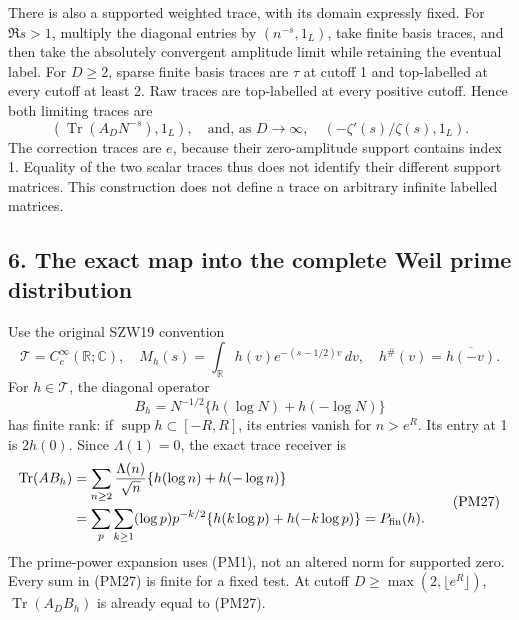 \documentclass[
  10pt,
  a4paper,
]{article}
\begin{document}
There is also a supported weighted trace, with its domain expressly
fixed. For \(\Re s>1\), multiply the diagonal entries by
\((n^{-s},1_L)\), take finite basis traces, and then take the absolutely
convergent amplitude limit while retaining the eventual label. For
\(D\ge2\), sparse finite basis traces are \(\tau\) at cutoff 1 and
top-labelled at every cutoff at least 2. Raw traces are top-labelled at
every positive cutoff. Hence both limiting traces are \[
\left(\operatorname{Tr}(A_DN^{-s}),1_L\right),
\quad\text{and, as }D\to\infty,\quad
\left(-\zeta'(s)/\zeta(s),1_L\right).
\tag{PM24}
\] The correction traces are \(e\), because their zero-amplitude support
contains index 1. Equality of the two scalar traces thus does not
identify their different support matrices. This construction does not
define a trace on arbitrary infinite labelled matrices.

\subsection{6. The exact map into the complete Weil prime
distribution}\label{the-exact-map-into-the-complete-weil-prime-distribution}

Use the original SZW19 convention \[
\mathcal T=C_c^\infty(\mathbb R;\mathbb C),\quad
M_h(s)=\int_{\mathbb R}h(v)e^{-(s-1/2)v}\,dv,
\quad h^\#(v)=\overline{h(-v)}.
\tag{PM25}
\] For \(h\in\mathcal T\), the diagonal operator \[
B_h=N^{-1/2}\{h(\log N)+h(-\log N)\}
\tag{PM26}
\] has finite rank: if \(\operatorname{supp}h\subset[-R,R]\), its
entries vanish for \(n>e^R\). Its entry at 1 is \(2h(0)\). Since
\(\Lambda(1)=0\), the exact trace receiver is \[
\begin{aligned}
\operatorname{Tr}(AB_h)
&=\sum_{n\ge2}\frac{\Lambda(n)}{\sqrt n}
\{h(\log n)+h(-\log n)\}\\
&=\sum_p\sum_{k\ge1}(\log p)p^{-k/2}
\{h(k\log p)+h(-k\log p)\}
=P_{\rm fin}(h).
\end{aligned}
\tag{PM27}
\] The prime-power expansion uses (PM1), not an altered norm for
supported zero. Every sum in (PM27) is finite for a fixed test. At
cutoff \(D\ge\max(2,\lfloor e^R\rfloor)\), \(\operatorname{Tr}(A_DB_h)\)
is already equal to (PM27).
\end{document}
